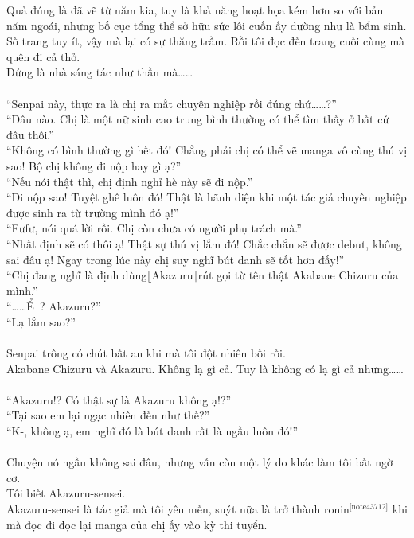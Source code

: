 \documentclass[12pt,a4paper, twosides]{book}
\begin{document}
Quả đúng là đã vẽ từ năm kia, tuy là khả năng hoạt họa kém hơn so với bản năm ngoái, nhưng bố cục tổng thể sở hữu sức lôi cuốn ấy dường như là bẩm sinh. Số trang tuy ít, vậy mà lại có sự thăng trầm. Rồi tôi đọc đến trang cuối cùng mà quên đi cả thở.\\
Đứng là nhà sáng tác như thần mà……\\
\\
“Senpai này, thực ra là chị ra mắt chuyên nghiệp rồi đúng chứ……?”\\
“Đâu nào. Chị là một nữ sinh cao trung bình thường có thể tìm thấy ở bất cứ đâu thôi.”\\
“Không có bình thường gì hết đó! Chẳng phải chị có thể vẽ manga vô cùng thú vị sao! Bộ chị không đi nộp hay gì ạ?”\\
“Nếu nói thật thì, chị định nghỉ hè này sẽ đi nộp.”\\
“Đi nộp sao! Tuyệt ghê luôn đó! Thật là hãnh diện khi một tác giả chuyên nghiệp được sinh ra từ trường mình đó ạ!”\\
“Fưfư, nói quá lời rồi. Chị còn chưa có người phụ trách mà.”\\
“Nhất định sẽ có thôi ạ! Thật sự thú vị lắm đó! Chắc chắn sẽ được debut, không sai đâu ạ! Ngay trong lúc này chị suy nghĩ bút danh sẽ tốt hơn đấy!”\\
“Chị đang nghĩ là định dùng$\lfloor$Akazuru$\rceil$rút gọi từ tên thật Akabane Chizuru của mình.”\\
“……Ể~? Akazuru?”\\
“Lạ lắm sao?”\\
\\
Senpai trông có chút bất an khi mà tôi đột nhiên bối rối.\\
Akabane Chizuru và Akazuru. Không lạ gì cả. Tuy là không có lạ gì cả nhưng……\\
\\
“Akazuru!? Có thật sự là Akazuru không ạ!?”\\
“Tại sao em lại ngạc nhiên đến như thế?”\\
“K-, không ạ, em nghĩ đó là bút danh rất là ngầu luôn đó!”\\
\\
Chuyện nó ngầu không sai đâu, nhưng vẫn còn một lý do khác làm tôi bất ngờ cơ.\\
Tôi biết Akazuru-sensei.\\
Akazuru-sensei là tác giả mà tôi yêu mến, suýt nữa là trở thành ronin$^\text{[note43712]}$ khi mà đọc đi đọc lại manga của chị ấy vào kỳ thi tuyển.\\
\end{document}
